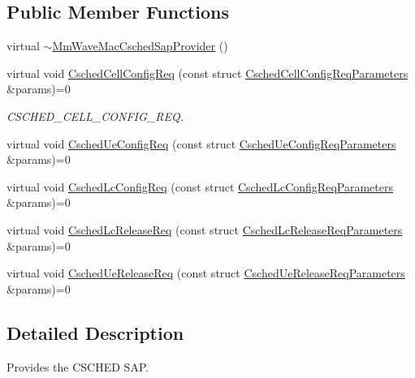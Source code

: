 \subsection*{Public Member Functions}
\begin{DoxyCompactItemize}
\item 
virtual \hyperlink{classns3_1_1MmWaveMacCschedSapProvider_a8142fbd5e045173b2ee2e14bd89a71b6}{$\sim$\+Mm\+Wave\+Mac\+Csched\+Sap\+Provider} ()
\item 
virtual void \hyperlink{classns3_1_1MmWaveMacCschedSapProvider_a9a17d4a125e06c669690aed99fed6a03}{Csched\+Cell\+Config\+Req} (const struct \hyperlink{structns3_1_1MmWaveMacCschedSapProvider_1_1CschedCellConfigReqParameters}{Csched\+Cell\+Config\+Req\+Parameters} \&params)=0
\begin{DoxyCompactList}\small\item\em C\+S\+C\+H\+E\+D\+\_\+\+C\+E\+L\+L\+\_\+\+C\+O\+N\+F\+I\+G\+\_\+\+R\+EQ. \end{DoxyCompactList}\item 
virtual void \hyperlink{classns3_1_1MmWaveMacCschedSapProvider_aaa8875f4b9b93463ddfd54e4eaa30080}{Csched\+Ue\+Config\+Req} (const struct \hyperlink{structns3_1_1MmWaveMacCschedSapProvider_1_1CschedUeConfigReqParameters}{Csched\+Ue\+Config\+Req\+Parameters} \&params)=0
\item 
virtual void \hyperlink{classns3_1_1MmWaveMacCschedSapProvider_abf7bb3f9d96546ac7e3e2f8b32fbaef8}{Csched\+Lc\+Config\+Req} (const struct \hyperlink{structns3_1_1MmWaveMacCschedSapProvider_1_1CschedLcConfigReqParameters}{Csched\+Lc\+Config\+Req\+Parameters} \&params)=0
\item 
virtual void \hyperlink{classns3_1_1MmWaveMacCschedSapProvider_a843c350540b66115e421e0014b313ea8}{Csched\+Lc\+Release\+Req} (const struct \hyperlink{structns3_1_1MmWaveMacCschedSapProvider_1_1CschedLcReleaseReqParameters}{Csched\+Lc\+Release\+Req\+Parameters} \&params)=0
\item 
virtual void \hyperlink{classns3_1_1MmWaveMacCschedSapProvider_a71346555e5ecb7fecbf27cf5658c1f0c}{Csched\+Ue\+Release\+Req} (const struct \hyperlink{structns3_1_1MmWaveMacCschedSapProvider_1_1CschedUeReleaseReqParameters}{Csched\+Ue\+Release\+Req\+Parameters} \&params)=0
\end{DoxyCompactItemize}


\subsection{Detailed Description}
Provides the C\+S\+C\+H\+ED S\+AP. 

